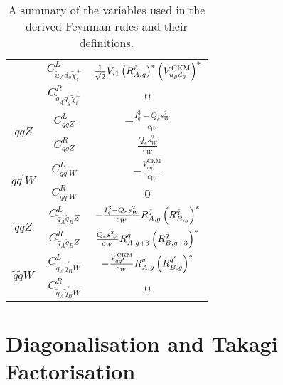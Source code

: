 \documentclass[../main.tex]{subfiles}
\begin{document}
{\begin{table}[ht!]
\begin{tabular}{|c|c|c|}
                                                           & \(C_{\tilde{u}_A d_g \tilde{\chi}^\pm_i}^L\)        & \(\frac{1}{\sqrt{2}} V_{i1} \left(R^{\tilde{u}}_{A,g}\right)^\ast \left(V_{u_g d_g}^\text{CKM}\right)^\ast\)   \\
                                                           & \(C_{\tilde{q}_A q^\prime_g \tilde{\chi}^\pm_i}^R\) & 0                                                                                                        \\
    \hline
    \multirow{2}{*}{\(q q Z\)}                             & \(C_{qqZ}^L\)                                       & \(-\frac{I^3_q - Q_e s_W^2}{c_W}\)                                                                       \\
                                                           & \(C_{qqZ}^R\)                                       & \(\frac{Q_e s_W^2}{c_W}\)                                                                                \\
    \hline
    \multirow{2}{*}{\(q q^\prime W\)}                      & \(C_{qq^\prime W}^L\)                               & \(-\frac{V^\text{CKM}_{q q^\prime}}{c_W}\)                                                               \\
                                                           & \(C_{qq^\prime W}^R\)                               & 0                                                                                                        \\
    \hline
    \multirow{2}{*}{\(\tilde{q} \tilde{q} Z\)}             & \(C_{\tilde{q}_A \tilde{q}_B Z}^L\)                 & \(-\frac{I^3_q - Q_e s_W^2}{c_W} R^{\tilde{q}}_{A,g} \left(R^{\tilde{q}}_{B,g}\right)^\ast\)                \\
                                                           & \(C_{\tilde{q}_A \tilde{q}_B Z}^R\)                 & \(\frac{Q_e s_W^2}{c_W} R^{\tilde{q}}_{A,g+3} \left(R^{\tilde{q}}_{B,g+3}\right)^\ast\)                     \\
    \hline
    \multirow{2}{*}{\(\tilde{q} \tilde{q} W\)}             & \(C_{\tilde{q}_A \tilde{q}_B^\prime W}^L\)          & \(-\frac{V^\text{CKM}_{q q^\prime}}{c_W} R^{\tilde{q}}_{A,g} \left(R^{\tilde{q}^\prime}_{B,g}\right)^\ast\) \\
                                                           & \(C_{\tilde{q}_A \tilde{q}_B^\prime W}^R\)          & 0                                                                                                        \\
    \hline
  \end{tabular}
  \caption{A summary of the variables used in the derived Feynman rules and their definitions.}
  \label{susy:tab:variable_definitions}
\end{table}
}


\section{Diagonalisation and Takagi Factorisation}
\end{document}
